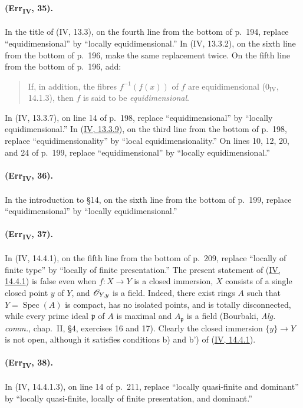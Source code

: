 {\paragraph{(Err\textsubscript{IV}, 35).}
In the title of (IV, 13.3), on the fourth line from the bottom of p.~194,
replace ``equidimensional'' by ``locally equidimensional.''  In
(IV, 13.3.2), on the sixth line from the bottom of p.~196, make the same
replacement twice.  On the fifth line from the bottom of p.~196, add:
\begin{quote}
If, in addition, the fibres $f^{-1}(f(x))$ of $f$ are equidimensional
($0_{\mathrm{IV}}$, 14.1.3), then $f$ is said to be
\emph{equidimensional}.
\end{quote}
In (IV, 13.3.7), on line 14 of p.~198, replace ``equidimensional'' by
``locally equidimensional.''  In ({\hyperref[IV.13.3.9]{IV, 13.3.9}}), on the third line from
the bottom of p.~198, replace ``equidimensionality'' by ``local
equidimensionality.''  On lines 10, 12, 20, and 24 of p.~199, replace
``equidimensional'' by ``locally equidimensional.''

\paragraph{(Err\textsubscript{IV}, 36).}
In the introduction to \S14, on the sixth line from the bottom of
p.~199, replace ``equidimensional'' by ``locally equidimensional.''

\paragraph{(Err\textsubscript{IV}, 37).}
In (IV, 14.4.1), on the fifth line from the bottom of p.~209, replace
``locally of finite type'' by ``locally of finite presentation.''  The
present statement of ({\hyperref[IV.14.4.1]{IV, 14.4.1}}) is false even when $f:X\to Y$ is a
closed immersion, $X$ consists of a single closed point $y$ of $Y$, and
$\mathscr{O}_{Y,y}$ is a field.  Indeed, there exist rings $A$ such that
$Y=\operatorname{Spec}(A)$ is compact, has no isolated points, and is
totally disconnected, while every prime ideal $\mathfrak p$ of $A$ is
maximal and $A_\mathfrak p$ is a field (Bourbaki,
\emph{Alg. comm.}, chap.~II, \S4, exercises 16 and 17).  Clearly the
closed immersion $\{y\}\to Y$ is not open, although it satisfies
conditions b) and b') of ({\hyperref[IV.14.4.1]{IV, 14.4.1}}).

\paragraph{(Err\textsubscript{IV}, 38).}
In (IV, 14.4.1.3), on line 14 of p.~211, replace ``locally quasi-finite
and dominant'' by ``locally quasi-finite, locally of finite presentation,
and dominant.''

}
